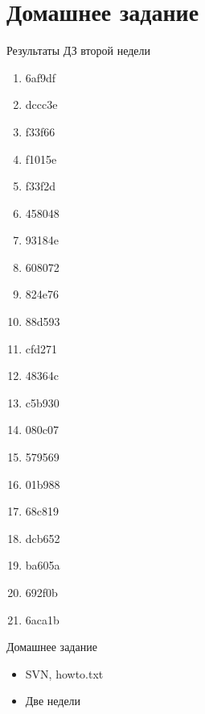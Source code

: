 \documentclass[14pt, fleqn, xcolor={dvipsnames, table}]{beamer}
\begin{document}
\section{Домашнее задание}
\begin{frame}{Результаты ДЗ второй недели}
\scriptsize
\begin{center}
\begin{enumerate}
\item 6af9df
\item dccc3e
\item f33f66
\item f1015e
\item f33f2d
\item 458048
\item 93184e
\item 608072
\item 824e76
\item 88d593
\item cfd271
\item 48364c
\item c5b930
\item 080c07
\item 579569
\item 01b988
\item 68c819
\item dcb652
\item ba605a
\item 692f0b
\item 6aca1b
\end{enumerate}
\end{center}
\end{frame}
\begin{frame}{Домашнее задание}
\begin{itemize}
\item SVN, howto.txt
\item Две недели
\end{itemize}
\end{frame}
\end{document}
